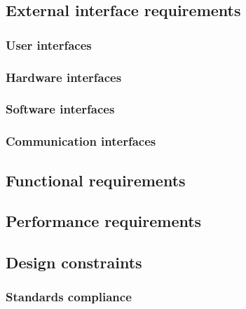 \documentclass[12pt]{article}
\begin{document}

  \subsection{External interface requirements}
    \subsubsection{User interfaces}
    \subsubsection{Hardware interfaces}
    \subsubsection{Software interfaces}
    \subsubsection{Communication interfaces}
  \subsection{Functional requirements}
  \subsection{Performance requirements}
  \subsection{Design constraints}
    \subsubsection{Standards compliance}
\end{document}
